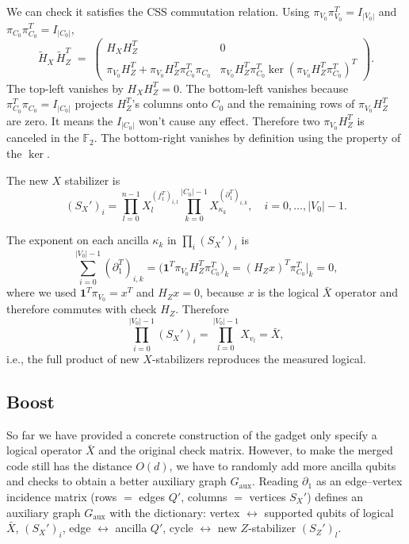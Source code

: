 \documentclass[a4paper, 12pt]{article}
\begin{document}
  We can check it satisfies the CSS commutation relation.
  Using $\pi_{V_0}\pi_{V_0}^{T}=I_{|V_0|}$ and $\pi_{C_0}\pi_{C_0}^{T}=I_{|C_0|}$,
  \begin{equation}
  \tilde H_X\,\tilde H_Z^{T} \;=\;
  \begin{pmatrix}
  H_X H_Z^{T} & 0 \\[2pt]
  \pi_{V_0}H_Z^{T}+\pi_{V_0}H_Z^{T}\pi_{C_0}^{T}\pi_{C_0} & \pi_{V_0}H_Z^{T}\pi_{C_0}^{T} \ker(\pi_{V_0}H_Z^{T}\pi_{C_0}^{T})^{T}
  \end{pmatrix}.
  \end{equation}
  The top-left vanishes by $H_X H_Z^{T}=0$. The bottom-left vanishes because
  $\pi_{C_0}^{T}\pi_{C_0} = I_{|C_0|}$ projects $H_Z^{T}$'s columns onto $C_0$ and the
  remaining rows of $\pi_{V_0} H_Z^{T}$ are zero. It means the $I_{|C_0|}$ won't cause any effect. Therefore two $\pi_{V_0} H_Z^{T}$ is canceled in the $\mathbb{F}_2$.
  The bottom-right vanishes by definition using the property of the $\ker$.

The new $X$ stabilizer is
  \begin{equation}
 (S_X')_i = \prod_{l=0}^{n-1} X_l^{(f_1^T)_{i,l}} \prod_{k=0}^{|C_0|-1} X_{\kappa_k}^{(\partial_1^T)_{i,k}}, \quad
  i=0,\dots,|V_0|-1.
  \end{equation}

The exponent on each ancilla $\kappa_k$ in $\prod_i (S_X')_i$ is
  \begin{equation}
  \sum_{i=0}^{|V_0|-1}(\partial_1^T)_{i,k}
  = \bigl(\mathbf{1}^T \pi_{V_0} H_Z^T \pi_{C_0}^T\bigr)_k
  = (H_Z x)^T \pi_{C_0}^T \big|_k
  = 0,
  \end{equation}
  where we used $\mathbf{1}^T \pi_{V_0} = x^T$ and $H_Z x = 0$, because $x$ is the logical $\bar{X}$ operator and therefore commutes with check $H_Z$. Therefore
  \begin{equation}
  \prod_{i=0}^{|V_0|-1}(S_X')_i = \prod_{l=0}^{|V_0|-1} X_{v_l} = \bar X,
  \end{equation}
  i.e., the full product of new $X$-stabilizers reproduces the measured logical.

\subsection{Boost}

So far we have provided a concrete construction of the gadget only specify a logical operator $\bar{X}$ and the original check matrix. However, to make the merged code still has the distance $O(d)$, we have to randomly add more ancilla qubits and checks to obtain a better auxiliary graph $G_{\mathrm{aux}}$. Reading $\partial_1$ as an edge--vertex incidence matrix (rows $=$ edges $Q'$, columns $=$ vertices $S_X'$) defines an auxiliary
  graph $G_{\mathrm{aux}}$ with the dictionary: vertex $\leftrightarrow$ supported qubits of logical $\bar{X}$, $(S_X')_i$,
  edge $\leftrightarrow$ ancilla $Q'$, cycle $\leftrightarrow$ new $Z$-stabilizer $(S_Z')_l$. 
  
\end{document}
